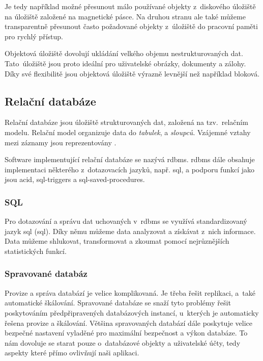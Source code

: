 Je tedy například možné přesunout málo používané objekty z~diskového úložiště na úložiště založené na magnetické pásce. Na druhou stranu ale také můžeme transparentně přesunout často požadované objekty z~úložiště do pracovní paměti pro rychlý přístup.

Objektová úložiště dovolují ukládání velkého objemu nestrukturovaných dat.
Tato úložiště jsou proto ideální pro uživatelské obrázky, dokumenty a zálohy.
Díky své flexibilitě jsou objektová úložiště výrazně levnější než například bloková.

\subsection{Relační databáze}

Relační databáze\cite{relational-database} jsou úložiště strukturovaných dat, založená na tzv.\ relačním modelu. Relační model organizuje data do \emph{tabulek},  a \emph{sloupců}. Vzájemné vztahy mezi záznamy jsou reprezentovány . 

Software implementující relační databáze se nazývá \acrfull{rdbms}. \acrshort{rdbms} dále obsahuje implementaci některého z~dotazovacích jazyků, např. \acrshort{sql}, a podporu funkcí jako jsou \acrshort{acid}, \glspl{sql-trigger} a \glspl{sql-saved-procedure}.

\subsubsection{SQL}

Pro dotazování a správu dat uchovaných v~\acrshort{rdbms} se využívá standardizovaný jazyk \acrshort{sql} (\acrlong{sql})\cite{sql}. Díky němu můžeme data analyzovat a získávat z~nich informace. Data můžeme shlukovat, transformovat a zkoumat pomocí nejrůznějších statistických funkcí.

\subsubsection{Spravované databáz}\label{subsub:managed-databases}

Provize a správa databází je velice komplikovaná. Je třeba řešit replikaci, a~také automatické škálování. Spravované databáze\cite{managed-databases} se snaží tyto problémy řešit poskytováním předpřipravených databázových instancí, u~kterých je automaticky řešena provize a škálování. Většina spravovaných databází dále poskytuje velice bezpečné nastavení vyladěné pro maximální bezpečnost a výkon databáze. To nám dovoluje se starat pouze o~databázové objekty a uživatelské účty, tedy aspekty které přímo ovlivňují naši aplikaci.

